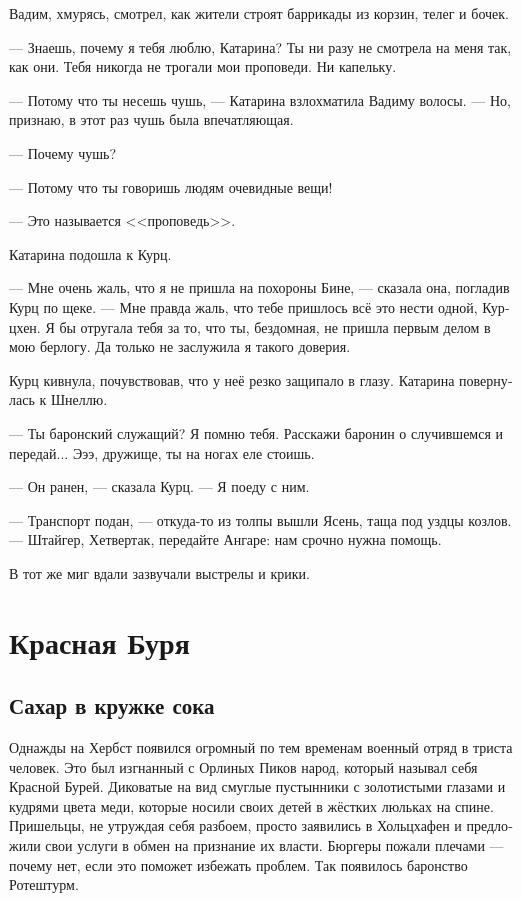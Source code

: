 \documentclass[a4paper,12pt,fleqn]{book}\usepackage{cooltooltips}\usepackage{polyglossia}\setdefaultlanguage[babelshorthands=true]{russian}\setotherlanguage{english}\defaultfontfeatures{Ligatures=TeX,Mapping=tex-text} \usepackage{xcolor}\definecolor{lightgray}{HTML}{bbbbbb}\color{lightgray}\newcommand{\ml}[3]{\textenglish{\textcolor{black}{#3}}}
\newcommand{\textspace}{\vspace{1em}{\centering\Large\bfseries<...>\par}\vspace{1em}}
\begin{document}
\textspace

Вадим, хмурясь, смотрел, как жители строят баррикады из корзин, телег и бочек.

--- Знаешь, почему я тебя люблю, Катарина?
Ты ни разу не смотрела на меня так, как они.
Тебя никогда не трогали мои проповеди.
Ни капельку.

--- Потому что ты несешь чушь, --- Катарина взлохматила Вадиму волосы.
--- Но, признаю, в этот раз чушь была впечатляющая.

--- Почему чушь?

--- Потому что ты говоришь людям очевидные вещи!

--- Это называется <<проповедь>>.

Катарина подошла к Курц.

--- Мне очень жаль, что я не пришла на похороны Бине, --- сказала она, погладив Курц по щеке.
--- Мне правда жаль, что тебе пришлось всё это нести одной, Курцхен.
Я бы отругала тебя за то, что ты, бездомная, не пришла первым делом в мою берлогу.
Да только не заслужила я такого доверия.

Курц кивнула, почувствовав, что у неё резко защипало в глазу.
Катарина повернулась к Шнеллю.

--- Ты баронский служащий?
Я помню тебя.
Расскажи баронин о случившемся и передай...
Эээ, дружище, ты на ногах еле стоишь.

--- Он ранен, --- сказала Курц.
--- Я поеду с ним.

--- Транспорт подан, --- откуда-то из толпы вышли Ясень, таща под уздцы козлов.
--- Штайгер, Хетвертак, передайте Ангаре: нам срочно нужна помощь.

В тот же миг вдали зазвучали выстрелы и крики.

\chapter{Красная Буря}

\section{Сахар в кружке сока}

Однажды на Хербст появился огромный по тем временам военный отряд в триста человек.
Это был изгнанный с Орлиных Пиков народ, который называл себя Красной Бурей.
Диковатые на вид смуглые пустынники с золотистыми глазами и кудрями цвета меди, которые носили своих детей в жёстких люльках на спине.
Пришельцы, не утруждая себя разбоем, просто заявились в Хольцхафен и предложили свои услуги в обмен на признание их власти.
Бюргеры пожали плечами --- почему нет, если это поможет избежать проблем.
Так появилось баронство Ротештурм.
\end{document}

